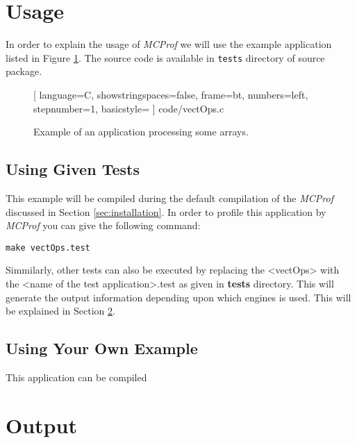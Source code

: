 \documentclass[11pt]{article}
\newcommand{\MCPROF}{\emph{MCProf}}
\begin{document}
\section{Usage}
\label{sec:usage}

In order to explain the usage of \MCPROF{} we will use the example application
listed in Figure \ref{fig:vectOps}. The source code is available in \verb|tests|
directory of source package.

\begin{figure} %
    \centering
%     
    
    [
    language=C,
    showstringspaces=false,
    frame=bt,
    numbers=left,
    stepnumber=1,
    basicstyle=\small %
    ] {code/vectOps.c}
    \caption{Example of an application processing some arrays.}
    \label{fig:vectOps}
\end{figure}


\subsection{Using Given Tests}

This example will be compiled during the default compilation of the
\MCPROF{} discussed in Section \ref{sec:installation}. In order to profile this
application by \MCPROF{} you can give the following command:

{
\small
\begin{Verbatim}[frame=single]
make vectOps.test
\end{Verbatim}
}

Simmilarly, other tests can also be executed by replacing the <vectOps> with the
<name of the test application>.test as given in \textbf{tests} directory. This
will generate the output information depending upon which engines is used. This
will be explained in Section \ref{sec:output}.

\subsection{Using Your Own Example}

This application can be compiled 


\section{Output}
\label{sec:output}
\end{document}
